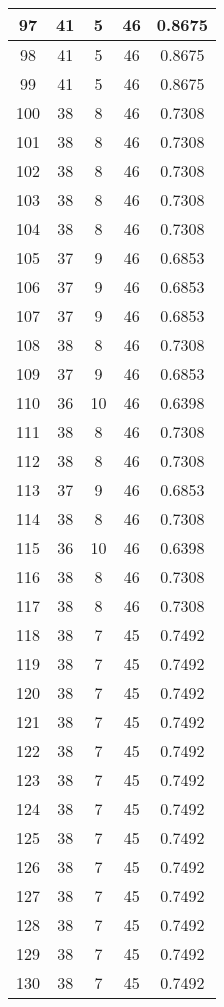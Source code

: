 \documentclass[letterpaper, 12pt]{article}
\begin{document}
\begin{longtable}{|c|c|c|c|c|}
\hline
97 & 41 & 5 & 46 & 0.8675 \\
\hline
98 & 41 & 5 & 46 & 0.8675 \\
\hline
99 & 41 & 5 & 46 & 0.8675 \\
\hline
100 & 38 & 8 & 46 & 0.7308 \\
\hline
101 & 38 & 8 & 46 & 0.7308 \\
\hline
102 & 38 & 8 & 46 & 0.7308 \\
\hline
103 & 38 & 8 & 46 & 0.7308 \\
\hline
104 & 38 & 8 & 46 & 0.7308 \\
\hline
105 & 37 & 9 & 46 & 0.6853 \\
\hline
106 & 37 & 9 & 46 & 0.6853 \\
\hline
107 & 37 & 9 & 46 & 0.6853 \\
\hline
108 & 38 & 8 & 46 & 0.7308 \\
\hline
109 & 37 & 9 & 46 & 0.6853 \\
\hline
110 & 36 & 10 & 46 & 0.6398 \\
\hline
111 & 38 & 8 & 46 & 0.7308 \\
\hline
112 & 38 & 8 & 46 & 0.7308 \\
\hline
113 & 37 & 9 & 46 & 0.6853 \\
\hline
114 & 38 & 8 & 46 & 0.7308 \\
\hline
115 & 36 & 10 & 46 & 0.6398 \\
\hline
116 & 38 & 8 & 46 & 0.7308 \\
\hline
117 & 38 & 8 & 46 & 0.7308 \\
\hline
118 & 38 & 7 & 45 & 0.7492 \\
\hline
119 & 38 & 7 & 45 & 0.7492 \\
\hline
120 & 38 & 7 & 45 & 0.7492 \\
\hline
121 & 38 & 7 & 45 & 0.7492 \\
\hline
122 & 38 & 7 & 45 & 0.7492 \\
\hline
123 & 38 & 7 & 45 & 0.7492 \\
\hline
124 & 38 & 7 & 45 & 0.7492 \\
\hline
125 & 38 & 7 & 45 & 0.7492 \\
\hline
126 & 38 & 7 & 45 & 0.7492 \\
\hline
127 & 38 & 7 & 45 & 0.7492 \\
\hline
128 & 38 & 7 & 45 & 0.7492 \\
\hline
129 & 38 & 7 & 45 & 0.7492 \\
\hline
130 & 38 & 7 & 45 & 0.7492 \\

\end{longtable}
\end{document}
